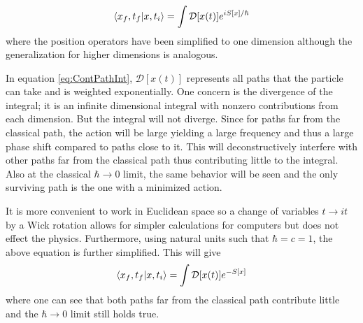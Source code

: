 \documentclass[11pt]{article}
\begin{document}
\begin{align}
	\bra{x_f,t_f}\ket{x,t_i}=\int\mathcal{D}[x(t)]e^{iS[x]/\hbar}
	\label{eq:ContPathInt}
\end{align}
where the position operators have been simplified to one dimension although the generalization for higher dimensions is analogous.

In equation \ref{eq:ContPathInt}, $\mathcal{D}[x(t)]$ represents all paths that the particle can take and is weighted exponentially. One concern is the divergence of the integral; it is an infinite dimensional integral with nonzero contributions from each dimension. But the integral will not diverge. Since for paths far from the classical path, the action will be large yielding a large frequency and thus a large phase shift compared to paths close to it. This will deconstructively interfere with other paths far from the classical path thus contributing little to the integral. Also at the classical $\hbar\to0$ limit, the same behavior will be seen and the only surviving path is the one with a minimized action.

It is more convenient to work in Euclidean space so a change of variables $t\to it$ by a Wick rotation allows for simpler calculations for computers but does not effect the physics. Furthermore, using natural units such that $\hbar=c=1$, the above equation is further simplified. This will give
\begin{align}
	\bra{x_f,t_f}\ket{x,t_i}=\int\mathcal{D}[x(t)]e^{-S[x]}
\end{align}	
where one can see that both paths far from the classical path contribute little and the $\hbar\to0$ limit still holds true.
\end{document}

